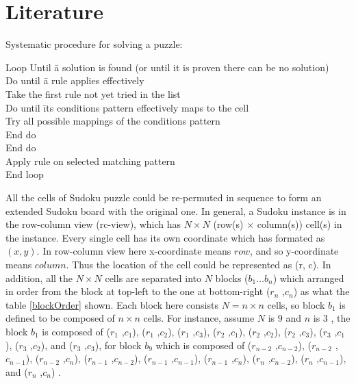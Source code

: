 \documentclass[11pt]{report}
\begin{document}
\section{Literature}
\label{sec:introLiterature}

Systematic procedure for solving a puzzle:
\begin{tabbing}
Loop Until \= a solution is found (or until it is proven there can be no solution) \\
\> Do until \= a rule applies  effectively \\
\> \> Take the first rule not yet tried in the list \\
\> \> Do until \= its conditions pattern effectively maps to the cell \\
\> \> \> Try all possible mappings of the conditions pattern \\
\> \> End do\\
\> End do\\
\> Apply rule on selected matching pattern \\
End loop\\
\end{tabbing}

All the cells of Sudoku puzzle could be re-permuted in sequence to form an extended Sudoku board with the original one. In general, a Sudoku instance is in the row-column view (rc-view), which has $N \times N$  (row(s) $\times$ column(s)) cell(s) in the instance. Every single cell has its own coordinate which has formated as $(x, y)$. In row-column view here x-coordinate means $row$, and so y-coordinate means $column$. Thus the location of the cell could be represented as (r, c). In addition, all the $N \times N$ cells are separated into $N$ blocks ($b_{1} \dots b_{n}$) which arranged in order from the block at top-left to the one at bottom-right ($r_{n}$ ,$c_{n}$) as what the table \ref{blockOrder} shown. Each block here consists $N = n \times n$ cells, so block $b_{1}$ is defined to be composed of $n \times n$ cells. For instance, assume $N$ is $9$ and $n$ is $3$ , the block $b_{1}$ is composed of ($r_{1}$ ,$c_{1}$), ($r_{1}$ ,$c_{2}$), ($r_{1}$ ,$c_{3}$), ($r_{2}$ ,$c_{1}$), ($r_{2}$ ,$c_{2}$), ($r_{2}$ ,$c_{3}$), ($r_{3}$ ,$c_{1}$), ($r_{3}$ ,$c_{2}$), and ($r_{3}$ ,$c_{3}$), for block $b_{9}$ which is composed of ($r_{n-2}$ ,$c_{n-2}$), ($r_{n-2}$ ,$c_{n-1}$), ($r_{n-2}$ ,$c_{n}$), ($r_{n-1}$ ,$c_{n-2}$), ($r_{n-1}$ ,$c_{n-1}$), ($r_{n-1}$ ,$c_{n}$), ($r_{n}$ ,$c_{n-2}$), ($r_{n}$ ,$c_{n-1}$), and ($r_{n}$ ,$c_{n}$) .
\end{document}
